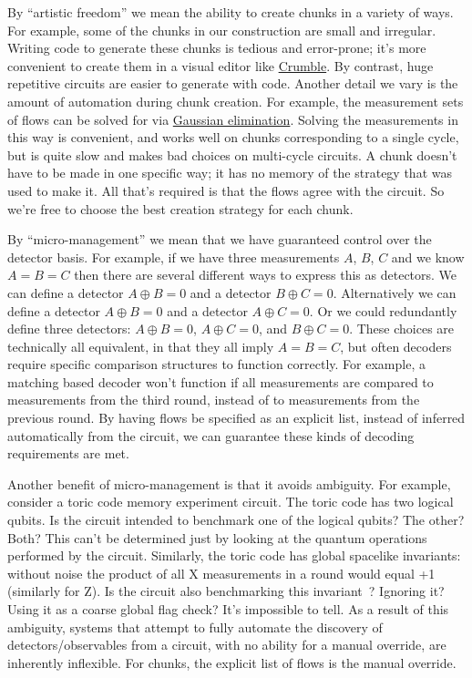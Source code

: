 \documentclass[onecolumn,unpublished,a4paper]{quantumarticle}
\theoremstyle{definition}
\begin{document}
By ``artistic freedom'' we mean the ability to create chunks in a variety of ways.
For example, some of the chunks in our construction are small and irregular.
Writing code to generate these chunks is tedious and error-prone; it's more convenient to create them in a visual editor like \href{https://algassert.com/crumble}{Crumble}.
By contrast, huge repetitive circuits are easier to generate with code.
Another detail we vary is the amount of automation during chunk creation.
For example, the measurement sets of flows can be solved for via \href{https://github.com/quantumlib/Stim/blob/main/doc/python_api_reference_vDev.md#stim.Circuit.flow_generators}{Gaussian elimination}.
Solving the measurements in this way is convenient, and works well on chunks corresponding to a single cycle, but is quite slow and makes bad choices on multi-cycle circuits.
A chunk doesn't have to be made in one specific way; it has no memory of the strategy that was used to make it.
All that's required is that the flows agree with the circuit.
So we're free to choose the best creation strategy for each chunk.

By ``micro-management'' we mean that we have guaranteed control over the detector basis.
For example, if we have three measurements $A$, $B$, $C$ and we know $A=B=C$ then there are several different ways to express this as detectors.
We can define a detector $A \oplus B = 0$ and a detector $B \oplus C = 0$.
Alternatively we can define a detector $A \oplus B = 0$ and a detector $A \oplus C = 0$.
Or we could redundantly define three detectors: $A \oplus B = 0$, $A \oplus C = 0$, and $B \oplus C = 0$.
These choices are technically all equivalent, in that they all imply $A=B=C$, but often decoders require specific comparison structures to function correctly.
For example, a matching based decoder won't function if all measurements are compared to measurements from the third round, instead of to measurements from the previous round.
By having flows be specified as an explicit list, instead of inferred automatically from the circuit, we can guarantee these kinds of decoding requirements are met.

Another benefit of micro-management is that it avoids ambiguity.
For example, consider a toric code memory experiment circuit.
The toric code has two logical qubits.
Is the circuit intended to benchmark one of the logical qubits? The other? Both?
This can't be determined just by looking at the quantum operations performed by the circuit.
Similarly, the toric code has global spacelike invariants: without noise the product of all X measurements in a round would equal +1 (similarly for Z).
Is the circuit also benchmarking this invariant~\cite{gidney2022stability}?
Ignoring it?
Using it as a coarse global flag check?
It's impossible to tell.
As a result of this ambiguity, systems that attempt to fully automate the discovery of detectors/observables from a circuit, with no ability for a manual override, are inherently inflexible.
For chunks, the explicit list of flows is the manual override.
\end{document}
